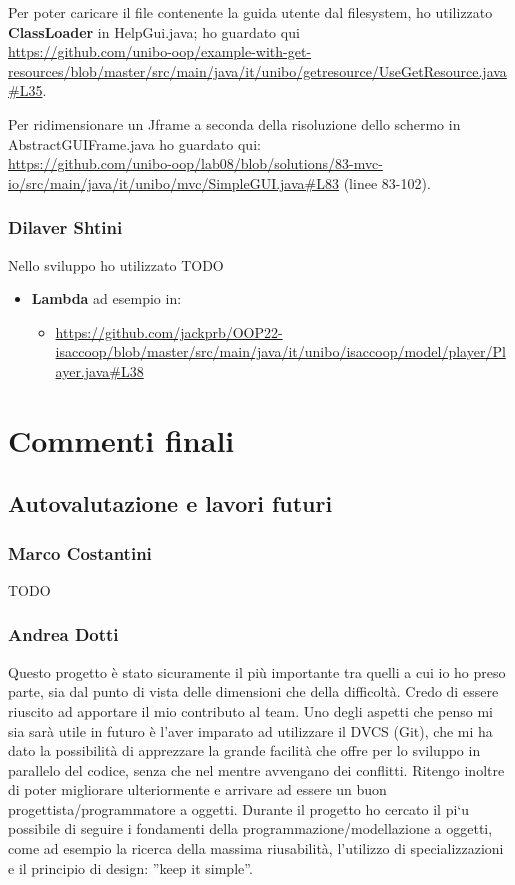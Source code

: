 \documentclass[a4paper,12pt]{report}
\begin{document}
Per poter caricare il file contenente la guida utente dal filesystem, ho utilizzato \textbf{ClassLoader} in HelpGui.java; ho guardato qui 
\\\url{https://github.com/unibo-oop/example-with-get-resources/blob/master/src/main/java/it/unibo/getresource/UseGetResource.java#L35}.

Per ridimensionare un Jframe a seconda della risoluzione dello schermo in AbstractGUIFrame.java ho guardato qui: 
\\\url{https://github.com/unibo-oop/lab08/blob/solutions/83-mvc-io/src/main/java/it/unibo/mvc/SimpleGUI.java#L83} (linee 83-102).


\subsection*{Dilaver Shtini}
Nello sviluppo ho utilizzato
{TODO}
\begin{itemize}
\item \textbf{Lambda} ad esempio in:
    \begin{itemize}
        \item \url{https://github.com/jackprb/OOP22-isaccoop/blob/master/src/main/java/it/unibo/isaccoop/model/player/Player.java#L38}
    \end{itemize}
\end{itemize}


\chapter{Commenti finali}

\section{Autovalutazione e lavori futuri}
\subsection*{Marco Costantini}
{TODO}

\subsection*{Andrea Dotti}
Questo progetto è stato sicuramente il più importante tra quelli a cui io ho preso parte, sia dal punto di vista delle dimensioni che della difficoltà. Credo di essere riuscito ad apportare il mio contributo al team. Uno degli aspetti che penso mi sia sarà utile in futuro è l’aver imparato ad utilizzare il DVCS (Git), che mi ha dato la possibilità di apprezzare la grande facilità che offre per lo sviluppo in parallelo del codice, senza che nel mentre avvengano dei conflitti. Ritengo inoltre di poter migliorare ulteriormente e arrivare ad essere un buon progettista/programmatore a oggetti. Durante il progetto ho cercato il pi`u possibile di seguire i fondamenti della programmazione/modellazione a oggetti, come ad esempio la ricerca della massima riusabilità, l’utilizzo di specializzazioni e il principio di design: ”keep it simple”.
\end{document}

